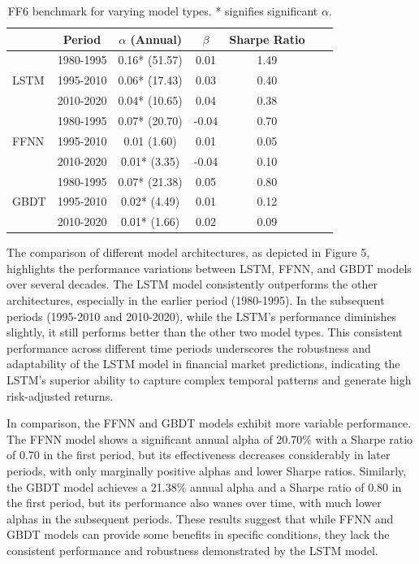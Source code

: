 \documentclass{article}
\begin{document}
\begin{table}[H]
    \centering
    \begin{tabular}{lcccccc}
        \toprule
         & Period & $\alpha$ (Annual) & $\beta$ & Sharpe Ratio \\
        \midrule
        \multirow{3}{*}{LSTM} & 1980-1995 & 0.16* (51.57) & 0.01 & 1.49 \\
                              & 1995-2010 & 0.06* (17.43) & 0.03 & 0.40 \\
                              & 2010-2020 & 0.04* (10.65) & 0.04 & 0.38 \\
        \midrule
        \multirow{3}{*}{FFNN} & 1980-1995 & 0.07* (20.70) & -0.04 & 0.70 \\
                              & 1995-2010 & 0.01 (1.60) & 0.01 & 0.05 \\
                              & 2010-2020 & 0.01* (3.35) & -0.04 & 0.10 \\
        \midrule
        \multirow{3}{*}{GBDT} & 1980-1995 & 0.07* (21.38) & 0.05 & 0.80 \\
                              & 1995-2010 & 0.02* (4.49) & 0.01 & 0.12 \\
                              & 2010-2020 & 0.01* (1.66) & 0.02 & 0.09 \\
        \bottomrule
    \end{tabular}
    \caption{FF6 benchmark for varying model types. * signifies significant $\alpha$.}
    \label{tab:model_comp}
\end{table}

The comparison of different model architectures, as depicted in Figure 5, highlights the performance variations between LSTM, FFNN, and GBDT models over several decades. The LSTM model consistently outperforms the other architectures, especially in the earlier period (1980-1995). In the subsequent periods (1995-2010 and 2010-2020), while the LSTM's performance diminishes slightly, it still performs better than the other two model types. This consistent performance across different time periods underscores the robustness and adaptability of the LSTM model in financial market predictions, indicating the LSTM's superior ability to capture complex temporal patterns and generate high risk-adjusted returns.

In comparison, the FFNN and GBDT models exhibit more variable performance. The FFNN model shows a significant annual alpha of 20.70\% with a Sharpe ratio of 0.70 in the first period, but its effectiveness decreases considerably in later periods, with only marginally positive alphas and lower Sharpe ratios. Similarly, the GBDT model achieves a 21.38\% annual alpha and a Sharpe ratio of 0.80 in the first period, but its performance also wanes over time, with much lower alphas in the subsequent periods. These results suggest that while FFNN and GBDT models can provide some benefits in specific conditions, they lack the consistent performance and robustness demonstrated by the LSTM model.
\end{document}
